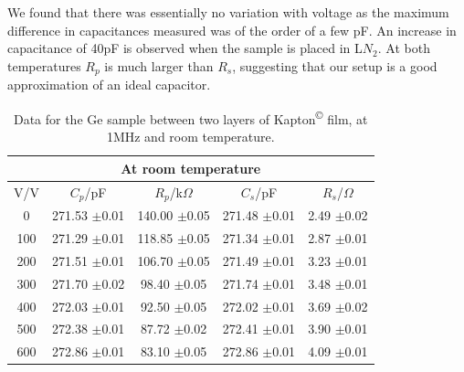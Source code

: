 \documentclass[a4paper,11pt]{article}
\begin{document}
We found that there was essentially no variation with voltage as the maximum difference in capacitances measured was of the order of a few pF. An increase in capacitance of 40pF is observed when the sample is placed in L$N_{2}$. At both temperatures $R_{p}$ is much larger than $R_{s}$, suggesting that our setup is a good approximation of an ideal capacitor.

\begin{table}[htbp]
\label{t:KapGeRT}
\begin{center}
	\caption{Data for the Ge sample between two layers of Kapton\textsuperscript{\copyright} film, at 1MHz and room temperature.}
\begin{tabular}{| c | c | c | c | c |}
	\hline
	\multicolumn{5}{|c|}{At room temperature}\\
	\hline
		V/V & $C_{p}$/pF & $R_{p}$/k$\Omega$ & $C_{s}$/pF & $R_{s}$/$\Omega$\\ \hline
		
		0 & 271.53 $\pm$0.01 & 140.00 $\pm$0.05 & 271.48 $\pm$0.01 & 2.49 $\pm$0.02\\ \hline
		100 & 271.29 $\pm$0.01 & 118.85 $\pm$0.05 & 271.34 $\pm$0.01 & 2.87 $\pm$0.01\\ \hline
		200 & 271.51 $\pm$0.01 & 106.70 $\pm$0.05 & 271.49 $\pm$0.01 & 3.23 $\pm$0.01\\ \hline
		300 & 271.70 $\pm$0.02 & 98.40 $\pm$0.05 & 271.74 $\pm$0.01 & 3.48 $\pm$0.01\\ \hline
		400 & 272.03 $\pm$0.01 & 92.50 $\pm$0.05 & 272.02 $\pm$0.01 & 3.69 $\pm$0.02\\ \hline
		500 & 272.38 $\pm$0.01 & 87.72 $\pm$0.02 & 272.41 $\pm$0.01 & 3.90 $\pm$0.01\\ \hline
		600 & 272.86 $\pm$0.01 & 83.10 $\pm$0.05 & 272.86 $\pm$0.01 & 4.09 $\pm$0.01 \\
	\hline
\end{tabular}
\end{center}	
\end{table}
\end{document}
